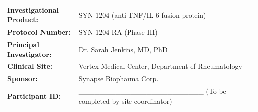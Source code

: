 \documentclass[11pt,a4paper]{article}
\begin{document}
\begin{table}[H]
\centering
\begin{tabularx}{\textwidth}{lX}
\toprule
\textbf{Investigational Product:} & SYN-1204 (anti-TNF/IL-6 fusion protein) \\
\textbf{Protocol Number:}         & SYN-1204-RA (Phase III) \\
\textbf{Principal Investigator:} & Dr. Sarah Jenkins, MD, PhD \\
\textbf{Clinical Site:}           & Vertex Medical Center, Department of Rheumatology \\
\textbf{Sponsor:}                 & Synapse Biopharma Corp. \\
\textbf{Participant ID:}          & \_\_\_\_\_\_\_\_\_\_\_\_\_\_\_\_\_\_\_\_\_\_\_\_ (To be completed by site coordinator) \\
\bottomrule
\end{tabularx}
\end{table}

\vspace{0.4cm}








\vspace{0.4cm}
\nocite{*}


\end{document}
